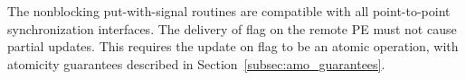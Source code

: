 \begin{apidefinition}
{    The nonblocking put-with-signal routines are compatible with all
    point-to-point synchronization interfaces. The delivery of  flag
    on the remote \ac{PE} must not cause partial updates. This requires the
    update on  flag to be an atomic operation, with atomicity
    guarantees described in Section~\ref{subsec:amo_guarantees}.
}

\end{apidefinition}
